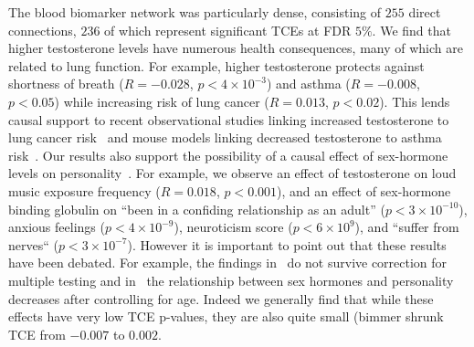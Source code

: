 \documentclass{article}
\begin{document}
The blood biomarker network was particularly dense,
consisting of $255$ direct connections, $236$ of which represent
significant TCEs at FDR $5\%$.
We find that higher testosterone levels have numerous health consequences, many of
which are related to lung function. For example, higher testosterone protects against
shortness of breath ($R = -0.028$, $p < 4\times 10^{-3}$) and asthma ($R = -0.008$, $p < 0.05$)
while increasing risk of lung cancer ($R = 0.013$, $p < 0.02$). This lends causal support to
recent observational studies linking increased testosterone to lung cancer risk~\cite{Hyde2012}
and mouse models linking decreased testosterone to asthma risk~\cite{Cephus2017}.
Our results also support the possibility of a causal effect of sex-hormone
levels on personality~\cite{Colangelo2012,Asselmann2019,Ekholm2014,Aluja2014}.
For example, we observe an effect of testosterone on loud
music exposure frequency ($R = 0.018$, $p < 0.001$), and
an effect of sex-hormone binding globulin on
``been in a confiding relationship as an adult'' ($p < 3 \times 10^{-10}$),
 anxious feelings ($p<4\times 10^{-9}$), neuroticism score ($p<6\times 10^{9}$), and ``suffer from nerves``
($p < 3\times 10^{-7}$). However it is important to point out that these results have been debated. For
example, the findings in~\cite{Asselmann2019} do not survive correction for multiple testing and
in~\cite{Aluja2014} the relationship between sex hormones and personality decreases after controlling
for age. Indeed we generally find that while these effects have very low TCE p-values, they 
are also quite small (bimmer shrunk TCE from $-0.007$ to $0.002$.
\end{document}
